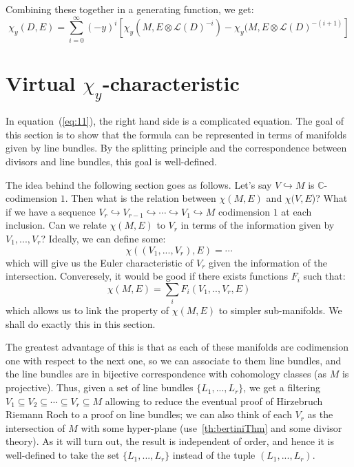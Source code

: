 \documentclass{ut-thesis}
\newcommand{\C}{{\mathbb{C}}}
\newcommand{\CL}{{\mathcal{L}}}
\newcommand{\sse}{\subseteq}
\begin{document}
Combining these together in a generating function, we get:
\begin{equation}\label{eq:11}
  \chi_y(D, E) = \sum_{i=0}^\infty (-y)^i [\chi_y(M, E\otimes \CL(D)^{-i}) - \chi_y (M, E\otimes
  \CL(D)^{-(i+1)}]
\end{equation}

\section{Virtual $\chi_y$-characteristic}\label{sec:virtualEulerChar}

In equation~(\ref{eq:11}), the right hand side is a complicated equation. The goal of this section is to show
that the formula can be represented in terms of manifolds given by line bundles. By the splitting principle
and the correspondence between divisors and line bundles, this goal is well-defined.

The idea behind the following section goes as follows. Let's say $V \hookrightarrow M$ is $\C$-codimension
$1$. Then what is the relation between $\chi(M, E)$ and $\chi(V, E$)? What if we have a sequence $V_r
\hookrightarrow V_{r-1} \hookrightarrow \cdots \hookrightarrow V_1 \hookrightarrow M$ codimension $1$ at
each inclusion. Can we relate $\chi(M, E)$ to $V_r$ in terms of the information given by $V_1, ..., V_r$? Ideally, we can define some:
\[
  \chi((V_1, ..., V_r), E) = \cdots
\]
which will give us the Euler characteristic of $V_r$ given the information of the intersection. Converesely,
it would be good if there exists functions $F_i$ such that:
\[
  \chi(M, E) = \sum_i F_i(V_1,.., V_r, E)
\]
which allows us to link the property of $\chi(M,E)$ to simpler sub-manifolds. We shall do exactly this in this
section.

The greatest advantage of this is that as each of these manifolds are codimension one with respect to the next
one, so we can associate to them line bundles, and the line bundles are in bijective correspondence with
cohomology classes (as $M$ is projective). Thus, given a set of line bundles $\{L_1, ..., L_r\}$, we get a
filtering $V_1 \sse V_2 \sse \cdots \sse V_r \sse M$ allowing to reduce the eventual proof of Hirzebruch
Riemann Roch to a proof on line bundles; we can also think of each $V_r$ as the intersection of $M$ with some
hyper-plane (use~\cref{th:bertiniThm} and some divisor theory). As it will turn out, the result is independent of order,
and hence it is well-defined to take the set $\{L_1, ..., L_r\}$ instead of the tuple $(L_1, ..., L_r)$.
\end{document}
